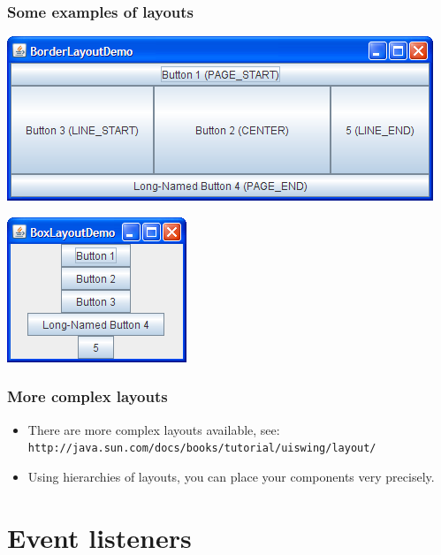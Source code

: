 \documentclass[10pt, handout]{beamer}
\begin{document}
\begin{frame}[fragile]
  \frametitle{Some examples of layouts}
  \begin{center}
    \includegraphics[width=0.6\linewidth]{BorderLayoutDemo}
  \end{center}
  \begin{center}
    \includegraphics[width=0.4\linewidth]{BoxLayoutDemo}
  \end{center}
\end{frame}

\begin{frame}[fragile]
  \frametitle{More complex layouts}
  \begin{itemize}
    \item There are more complex layouts available, see:
      \verb!http://java.sun.com/docs/books/tutorial/uiswing/layout/!
    \item Using hierarchies of layouts, you can place your components very precisely.
  \end{itemize}
\end{frame}

\section{Event listeners}
\end{document}
